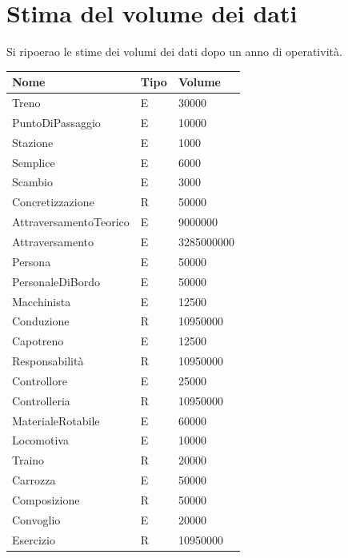 \documentclass[a4paper,12pt]{report}
\begin{document}
	\section{Stima del volume dei dati}
	\par Si ripoerao le stime dei volumi dei dati dopo un anno di operatività.
	\begin{table}[H]
	\centering
	\begin{tabular}{|l|l|l|}
		\hline \textbf{Nome} & \textbf{Tipo} & \textbf{Volume} \\
		\hline Treno & E & 30000 \\
		\hline PuntoDiPassaggio & E & 10000 \\
		\hline Stazione & E & 1000 \\
		\hline Semplice & E & 6000 \\
		\hline Scambio & E & 3000 \\
		\hline Concretizzazione & R & 50000 \\
		\hline AttraversamentoTeorico & E & 9000000 \\
		\hline Attraversamento & E & 3285000000 \\
		\hline Persona & E & 50000 \\
		\hline PersonaleDiBordo & E & 50000 \\
		\hline Macchinista & E & 12500 \\
		\hline Conduzione & R & 10950000 \\
		\hline Capotreno & E & 12500 \\
		\hline Responsabilit\`a & R & 10950000 \\
		\hline Controllore & E & 25000 \\
		\hline Controlleria & R & 10950000 \\
		\hline MaterialeRotabile & E & 60000 \\
		\hline Locomotiva & E & 10000 \\
		\hline Traino & R & 20000 \\
		\hline Carrozza & E & 50000 \\
		\hline Composizione & R & 50000 \\
		\hline Convoglio & E & 20000 \\
		\hline Esercizio & R & 10950000 \\
		\hline
	\end{tabular}
	\end{table}
\end{document}
